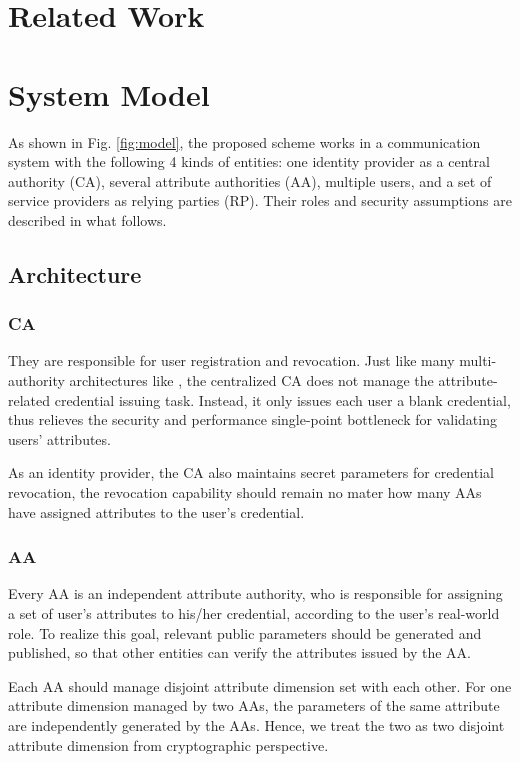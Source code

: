 \documentclass[journal]{IEEEtran}
\begin{document}
\section{Related Work}\label{sec:related}

\section{System Model}\label{sec:model}
As shown in Fig. \ref{fig:model}, the proposed scheme works in a communication system with the following 4 kinds of entities: one identity provider as a central authority (CA), several attribute authorities (AA), multiple users, and a set of service providers as relying parties (RP). Their roles and security assumptions are described in what follows. 

\subsection{Architecture}
\subsubsection{CA}
They are responsible for user registration and revocation. Just like many multi-authority architectures like \cite{Chase2007Multi, yang2013dac}, the centralized CA does not manage the attribute-related credential issuing task. Instead, it only issues each user a blank credential, thus relieves the security and performance single-point bottleneck for validating users' attributes. 

As an identity provider, the CA also maintains secret parameters for credential revocation, the revocation capability should remain no mater how many AAs have assigned attributes to the user's credential.


\subsubsection{AA} Every AA is an independent attribute authority, who is responsible for assigning a set of user's attributes to his/her credential, according to the user's real-world role. To realize this goal, relevant public parameters should be generated and published, so that other entities can verify the attributes issued by the AA. 

Each AA should manage disjoint attribute dimension set with each other. For one attribute dimension managed by two AAs, the parameters of the same attribute are independently generated by the AAs. Hence, we treat the two as two disjoint attribute dimension from cryptographic perspective.
\end{document}
